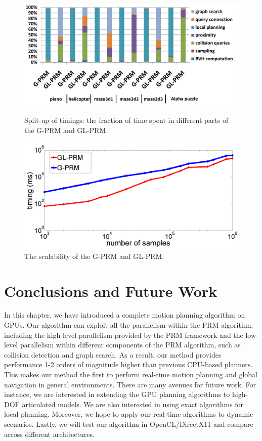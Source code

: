 \begin{figure}[htb]
  \centering
  \includegraphics[width=0.9\linewidth]{figs/4/breakdown.pdf}
  \caption[Split-up of timings for the GPU-based planner]{Split-up of timings: the fraction of time spent in different parts of the G-PRM and GL-PRM.}
  \label{fig:4:breakdown}

  \centering
  \includegraphics[width=0.9\linewidth]{figs/4/scalability.png}
  \caption[The scalability of G-PRM and GL-PRM algorithms]{The scalability of the G-PRM and GL-PRM.}
  \label{fig:4:scalability}
\end{figure}

\section{Conclusions and Future Work}
In this chapter, we have introduced a complete motion planning algorithm on GPUs. Our algorithm can exploit all the parallelism within the PRM algorithm, including the high-level parallelism provided by the PRM framework and the low-level parallelism within different components of the PRM algorithm, such as collision detection and graph search. As a result, our method provides performance 1-2 orders of magnitude higher than previous CPU-based planners. This makes our method the first to perform real-time motion planning and global navigation in general environments.
There are many avenues for future work. For instance, we are interested in extending the GPU planning algorithms to high-DOF articulated models. We are also interested in using exact algorithms for local planning. Moreover, we hope to apply our real-time algorithms to dynamic scenarios. Lastly, we will test our algorithm in OpenCL/DirectX11 and compare across different architectures.
